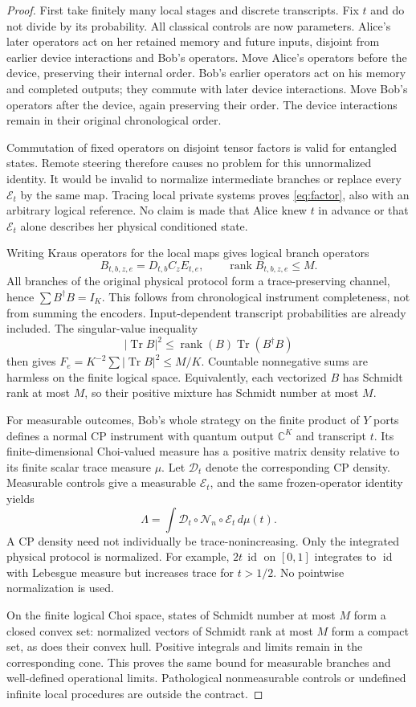 \documentclass[11pt]{article}
\newcommand{\Tr}{\operatorname{Tr}}
\newcommand{\rank}{\operatorname{rank}}
\newcommand{\id}{\operatorname{id}}
\newcommand{\cN}{\mathcal N}
\begin{document}
\begin{proof}
First take finitely many local stages and discrete transcripts. Fix $t$ and do not divide by its probability. All classical controls are now parameters. Alice's later operators act on her retained memory and future inputs, disjoint from earlier device interactions and Bob's operators. Move Alice's operators before the device, preserving their internal order. Bob's earlier operators act on his memory and completed outputs; they commute with later device interactions. Move Bob's operators after the device, again preserving their order. The device interactions remain in their original chronological order.

Commutation of fixed operators on disjoint tensor factors is valid for entangled states. Remote steering therefore causes no problem for this unnormalized identity. It would be invalid to normalize intermediate branches or replace every $\mathcal E_t$ by the same map. Tracing local private systems proves \eqref{eq:factor}, also with an arbitrary logical reference. No claim is made that Alice knew $t$ in advance or that $\mathcal E_t$ alone describes her physical conditioned state.

Writing Kraus operators for the local maps gives logical branch operators
\[
 B_{t,b,z,e}=D_{t,b}C_zE_{t,e},\qquad \rank B_{t,b,z,e}\le M.
\]
All branches of the original physical protocol form a trace-preserving channel, hence $\sum B^\dagger B=I_K$. This follows from chronological instrument completeness, not from summing the encoders. Input-dependent transcript probabilities are already included. The singular-value inequality
\[
 |\Tr B|^2\le\rank(B)\Tr(B^\dagger B)
\]
then gives $F_e=K^{-2}\sum|\Tr B|^2\le M/K$. Countable nonnegative sums are harmless on the finite logical space. Equivalently, each vectorized $B$ has Schmidt rank at most $M$, so their positive mixture has Schmidt number at most $M$.

For measurable outcomes, Bob's whole strategy on the finite product of $Y$ ports defines a normal CP instrument with quantum output $\mathbb C^K$ and transcript $t$. Its finite-dimensional Choi-valued measure has a positive matrix density relative to its finite scalar trace measure $\mu$. Let $\mathcal D_t$ denote the corresponding CP density. Measurable controls give a measurable $\mathcal E_t$, and the same frozen-operator identity yields
\[
 \Lambda=\int\mathcal D_t\circ\cN_n\circ\mathcal E_t\,d\mu(t).
\]
A CP density need not individually be trace-nonincreasing. Only the integrated physical protocol is normalized. For example, $2t\,\id$ on $[0,1]$ integrates to $\id$ with Lebesgue measure but increases trace for $t>1/2$. No pointwise normalization is used.

On the finite logical Choi space, states of Schmidt number at most $M$ form a closed convex set: normalized vectors of Schmidt rank at most $M$ form a compact set, as does their convex hull. Positive integrals and limits remain in the corresponding cone. This proves the same bound for measurable branches and well-defined operational limits. Pathological nonmeasurable controls or undefined infinite local procedures are outside the contract.
\end{proof}
\end{document}
